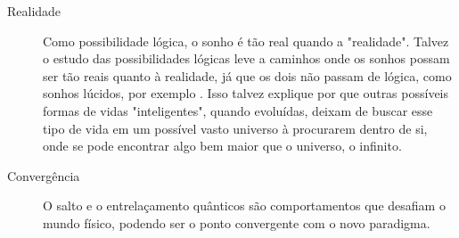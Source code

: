 \begin{description}
	   \item[Realidade] Como possibilidade lógica, o sonho é tão real quando a "realidade". Talvez o estudo das possibilidades lógicas leve a caminhos onde os sonhos possam ser tão reais quanto à realidade, já que os dois não passam de lógica, como sonhos lúcidos, por exemplo \cite{lucid_dreams}. Isso talvez explique por que outras possíveis formas de vidas "inteligentes", quando evoluídas, deixam de buscar esse tipo de vida em um possível vasto universo à procurarem dentro de si, onde se pode encontrar algo bem maior que o universo, o infinito.
	   \item[Convergência] O salto e o entrelaçamento quânticos são comportamentos que desafiam o mundo físico, podendo ser o ponto convergente com o novo paradigma.
	\end{description}